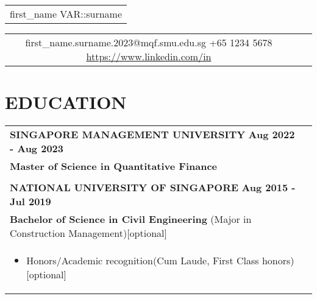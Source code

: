 \documentclass[a4paper,8pt]{article}
\begin{document}
\pagestyle{empty} 

\begin{tabularx}{\linewidth}{@{} C @{}}
\Huge{first\_name VAR::surname} \\[6pt]
\end{tabularx}

\begin{tabularx}{\linewidth}{@{} C @{} C @{} C}
{{\raisebox{-0.05\height}{\faEnvelope} first\_name.surname.2023@mqf.smu.edu.sg}} 
{{\raisebox{-0.05\height}{\faMobile} +65 1234 5678}} 
{{\href{https://www.linkedin.com/in/nameisjamiele}{\raisebox{-0.05\height}{\faLinkedin} https://www.linkedin.com/in}}}
\end{tabularx}

\section{\textbf{EDUCATION}}
\begin{tabularx}{\linewidth}{ @{}l r@{}}
\textbf{SINGAPORE MANAGEMENT UNIVERSITY} \hfill \textbf{Aug 2022 - Aug 2023} \\[4pt]
\textbf{Master of Science in Quantitative Finance}\\[4pt]
\\[4pt]
\textbf{NATIONAL UNIVERSITY OF SINGAPORE} \hfill \textbf{Aug 2015 - Jul 2019}\\[4pt]
\textbf{Bachelor of Science in Civil Engineering} (Major in Construction Management)[optional]\\[4pt]
\begin{minipage}[t]{\linewidth}
    \begin{itemize}[nosep, after=\strut, leftmargin=1em, itemsep=2pt]
        \item Honors/Academic recognition(Cum Laude, First Class honors)[optional]
    \end{itemize}
\end{minipage}
\end{tabularx}

\end{document}
